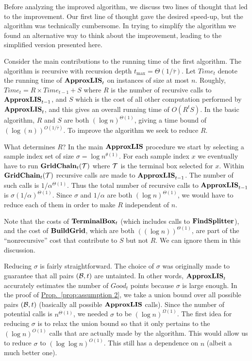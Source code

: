 \documentclass{acmsmall}
\newcommand{\cB}{{\cal B}}
\newcommand{\cT}{{\cal T}}
\newcommand{\Prop}[1]{\hyperref[prop:#1]{Prop.~\ref*{prop:#1}}} %
\newcommand{\terminalbox}{{\rm{\bf TerminalBox}}}
\newcommand{\taupar}{\overline{\tau}}
\newcommand{\gridprec}{\alpha}
\newcommand{\ssz}{\sigma}
\newcommand{\approxlis}{{\rm {\bf ApproxLIS}}}
\newcommand{\findsplitter}{{\rm {\bf FindSplitter}}}
\newcommand{\buildgrid}{{\rm {\bf BuildGrid}}}
\newcommand{\gridchain}{{\rm {\bf GridChain}}}
\begin{document}
Before analyzing the improved algorithm, we discuss two lines of thought that led to the improvement.
Our first line of thought gave the desired speed-up, but the algorithm was technically cumbersome. 
In trying to simplify the algorithm we found an alternative way to think about the improvement,
leading to the simplified version presented here.

Consider the main contributions  to the running time of the first algorithm.
The algorithm is recursive with recursion depth $t_{\max}=\Theta(1/\taupar)$.
Let $Time_t$ denote the running time of $\approxlis_t$ on instances of size at most $n$.  
Roughly,
$Time_t=R \times Time_{t-1}+S$ where $R$ is the number of recursive calls to $\approxlis_{t-1}$,
and $S$ which is the cost of all other computation performed by $\approxlis_t$, and this gives an overall running time of
$O(R^t S)$.  In the basic algorithm, $R$ and $S$ are both $(\log n)^{\Theta(1)}$, giving a time bound
of $(\log(n))^{O(1/\taupar)}$.  To improve the algorithm
we seek to reduce $R$.

What determines $R$?  In the main $\approxlis$ procedure we start by selecting a sample index set of size $\ssz=\log n^{\theta(1)}$.
For each sample index $x$ we eventually have to run $\gridchain_t(\cT)$ where $\cT$ is the terminal box
selected for $x$.  Within $\gridchain_t(\cT)$ recursive calls are made to $\approxlis_{t-1}$.  The number of
such calls is $1/\gridprec^{\Theta(1)}$.  Thus the total number of recursive calls
to $\approxlis_{t-1}$ is $\ssz (1/\gridprec)^{\Theta(1)}$.  Since $\ssz$ and $1/\gridprec$ are both
$(\log n)^{\Theta(1)}$, we would have to reduce each of them in order to make $R$ independent of $n$.

Note that the costs of $\terminalbox_t$ (which includes calls to $\findsplitter$), and the cost
of $\buildgrid$, which are both $((\log n))^{\Theta(1)}$, are part of the ``nonrecursive'' cost that contribute to
$S$ but not $R$. We can ignore them in this discussion.

Reducing $\ssz$ is fairly straightforward.
The choice of  $\ssz$ was originally made to guarantee that all pairs $(\cB,t)$ are untainted.
In other words, $\approxlis_t$ accurately estimates the number of $Good_t$ points
because $\ssz$ is large enough. In the proof of \Prop{assumption 2}, we take a union bound over all possible pairs $(\cB,t)$ (basically
all possible $\approxlis$ calls).  Since the number
of potential calls is $n^{\Theta(1)}$, we needed $\ssz$ to be $(\log n)^{\Omega(1)}$.
The first idea for reducing $\ssz$ is to relax the union bound so that it only pertains to the $(\log n)^{O(1)}$
calls that are actually made by the algorithm. This would allow us
to reduce $\ssz$ to $(\log\log n)^{O(1)}$. This
still has a dependence on $n$ (albeit a much better one). 
\end{document}
